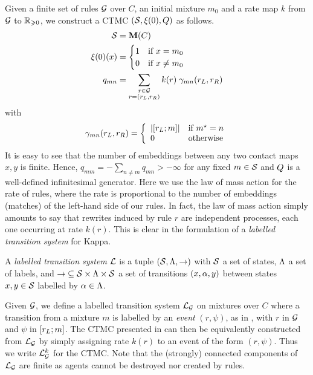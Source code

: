 Given a finite set of rules $\mathcal{G}$ over $C$,
an initial mixture $m_0$
and a rate map $k$ from $\mathcal{G}$ to $\mathbb{R}_{\geqslant 0}$,
we construct a CTMC $\left(\mathcal{S}, \xi(0), Q\right)$ as follows.
\begin{align}
  \label{eq:kappa-ctmc}
  \mathcal{S} &= \mathbf{M}(C) \nonumber \\
  \xi(0)(x) &= \begin{cases}
    1 \quad\text{if } x = m_0 \\
    0 \quad\text{if } x \neq m_0
  \end{cases} \\
  q_{mn} &= \sum_{\substack{r \in \mathcal{G}\\r = \left(r_L,r_R\right)}}
    k(r) \; \gamma_{mn}(r_L,r_R) \nonumber
\end{align}
with
\begin{equation*}
  \gamma_{mn}(r_L,r_R) = \left\{\begin{array}{ll}
    \left\lvert \left[r_L;m\right] \right\rvert & \text{if } m^\star = n \\
    0 & \text{otherwise}
  \end{array}\right.
\end{equation*}
It is easy to see that the number of embeddings
between any two contact maps $x,y$ is finite.
Hence, $q_{mm} = -\sum_{n \neq m} q_{mn} > -\infty$
for any fixed $m \in \mathcal{S}$
and $Q$ is a well-defined infinitesimal generator.
Here we use the law of mass action for the rate of rules,
where the rate is proportional to the number of embeddings (matches)
of the left-hand side of our rules.
In fact, the law of mass action simply amounts to say that
rewrites induced by rule $r$ are independent processes,
each one occurring at rate $k(r)$.
This is clear in the formulation of
a \emph{labelled transition system} for Kappa.

\begin{definition}
  A \emph{labelled transition system} $\mathcal{L}$ is a tuple
  $\left(\mathcal{S},\Lambda,\to\right)$ with
  $\mathcal{S}$ a set of states,
  $\Lambda$ a set of labels,
  and $\to\; \subseteq \mathcal{S} \times \Lambda \times \mathcal{S}$
  a set of transitions $\left(x,\alpha,y\right)$
  between states $x,y \in \mathcal{S}$
  labelled by $\alpha \in \Lambda$.
\end{definition}

Given $\mathcal{G}$,
we define a labelled transition system $\mathcal{L}_{\mathcal{G}}$
on mixtures over $C$ where
a transition from a mixture $m$ is labelled by
an \emph{event} $(r,\psi)$, as in ,
with $r$ in $\mathcal{G}$ and $\psi$ in $\left[r_L;m\right]$.
The CTMC presented in  can then be equivalently
constructed from $\mathcal{L}_{\mathcal{G}}$ by simply assigning
rate $k(r)$ to an event of the form $(r,\psi)$.
Thus we write $\mathcal{L}^k_{\mathcal{G}}$ for the CTMC.
Note that the (strongly) connected components of $\mathcal{L}_{\mathcal{G}}$
are finite as agents cannot be destroyed nor created by rules.

